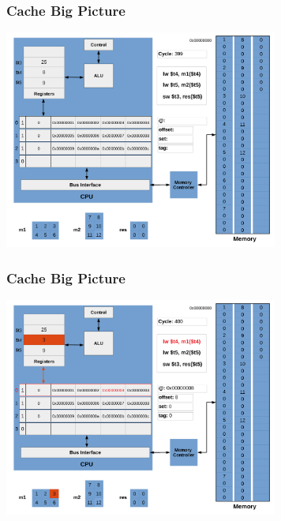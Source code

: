 \documentclass{beamer}
\begin{document}
\begin{frame}[fragile]
\frametitle{Cache Big Picture}

\begin{center}
\vspace*{-0.23cm}
\hspace*{-1cm}\includegraphics[width=9cm]{cache29.pdf}
\end{center}

\end{frame}

\begin{frame}[fragile]
\frametitle{Cache Big Picture}

\begin{center}
\vspace*{-0.23cm}
\hspace*{-1cm}\includegraphics[width=9cm]{cache30.pdf}
\end{center}

\end{frame}
\end{document}

